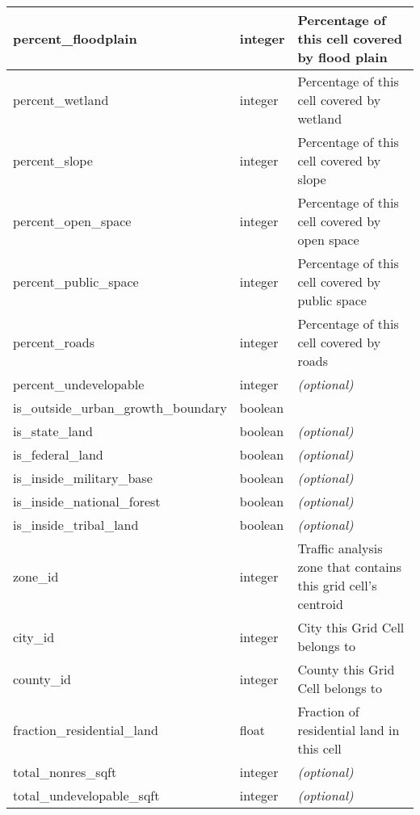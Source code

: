 \begin{tabular}{|p{2in}|l|p{3.5in}|}
\hline
percent_floodplain & integer & Percentage of this cell covered by flood plain  \\
\hline
percent_wetland & integer & Percentage of this cell covered by wetland  \\
\hline
percent_slope & integer & Percentage of this cell covered by slope  \\
\hline
percent_open_space & integer & Percentage of this cell covered by open space  \\
\hline
percent_public_space & integer & Percentage of this cell covered by public space  \\
\hline
percent_roads & integer & Percentage of this cell covered by roads  \\
\hline
percent_undevelopable & integer & \emph{(optional) }
\\
\hline
is_outside_urban_growth_boundary & boolean & \\
\hline
is_state_land & boolean & \emph{(optional) }
\\
\hline
is_federal_land & boolean & \emph{(optional) }
\\
\hline
is_inside_military_base & boolean & \emph{(optional) }
\\
\hline
is_inside_national_forest & boolean & \emph{(optional) }
\\
\hline
is_inside_tribal_land & boolean & \emph{(optional) }
\\
\hline
zone_id & integer & Traffic analysis zone that contains this grid cell's centroid  \\
\hline
city_id & integer & City this Grid Cell belongs to  \\
\hline
county_id & integer & County this Grid Cell belongs to  \\
\hline
fraction_residential_land & float & Fraction of residential land in this cell  \\
\hline
total_nonres_sqft & integer & \emph{(optional) }
\\
\hline
total_undevelopable_sqft & integer & \emph{(optional) }
\\
\hline

\end{tabular}

